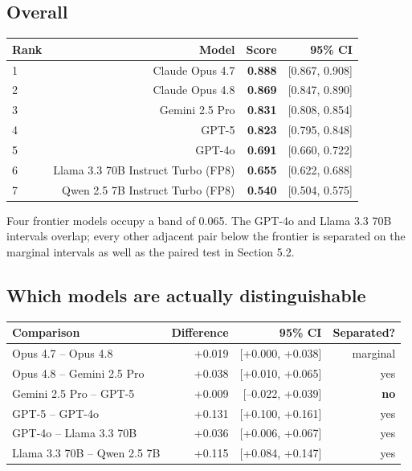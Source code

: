 \documentclass[11pt,a4paper]{article}
\begin{document}
\subsection{Overall}

\begin{center}
\begin{tabular}{lrrr}
\toprule
Rank & Model & Score & 95\% CI \\
\midrule
1 & Claude Opus 4.7 & \textbf{0.888} & [0.867, 0.908] \\
2 & Claude Opus 4.8 & \textbf{0.869} & [0.847, 0.890] \\
3 & Gemini 2.5 Pro & \textbf{0.831} & [0.808, 0.854] \\
4 & GPT-5 & \textbf{0.823} & [0.795, 0.848] \\
5 & GPT-4o & \textbf{0.691} & [0.660, 0.722] \\
6 & Llama 3.3 70B Instruct Turbo (FP8) & \textbf{0.655} & [0.622, 0.688] \\
7 & Qwen 2.5 7B Instruct Turbo (FP8) & \textbf{0.540} & [0.504, 0.575] \\
\bottomrule
\end{tabular}
\end{center}

Four frontier models occupy a band of 0.065. The GPT-4o and Llama 3.3 70B intervals overlap; every other adjacent pair below the frontier is separated on the marginal intervals as well as the paired test in Section 5.2.

\subsection{Which models are actually distinguishable}

\begin{center}
\begin{tabular}{lrrr}
\toprule
Comparison & Difference & 95\% CI & Separated? \\
\midrule
Opus 4.7 -- Opus 4.8 & +0.019 & [+0.000, +0.038] & marginal \\
Opus 4.8 -- Gemini 2.5 Pro & +0.038 & [+0.010, +0.065] & yes \\
Gemini 2.5 Pro -- GPT-5 & +0.009 & [--0.022, +0.039] & \textbf{no} \\
GPT-5 -- GPT-4o & +0.131 & [+0.100, +0.161] & yes \\
GPT-4o -- Llama 3.3 70B & +0.036 & [+0.006, +0.067] & yes \\
Llama 3.3 70B -- Qwen 2.5 7B & +0.115 & [+0.084, +0.147] & yes \\
\bottomrule
\end{tabular}
\end{center}
\end{document}
